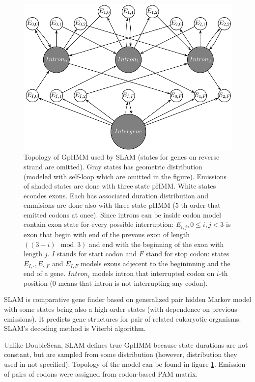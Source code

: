 \begin{figure}
\begin{center}
\includegraphics{../figures/slam.pdf}
\end{center}
\caption[HMM topology of SLAM's GpHMM]{
Topology of GpHMM used by SLAM (states for genes on reverse strand are omitted).
Gray states has geometric distribution (modeled with self-loop which are omitted
in the figure). Emissions of shaded states are done with three state pHMM. White
states econdes exons. Each has associated duration distribution and emmisions
are done also with three-state pHMM ($5$-th order that emitted codons at once).
Since introns can be inside codon model contain exon state for every possible
interruption: $E_{i,j},0\leq i,j<3$ is exon that begin with end of the prevous
exon of length $((3-i)\mod 3)$ and end with the beginning of the exon with
length $j$. $I$ stands for start codon and $F$ stand for stop codon: states
$E_{I,\cdot},E_{\cdot,F}$ and $E_{I,F}$ models exons adjecent to the begininning
and the end of a gene.  $Intron_i$ models intron that interrupted codon on
$i$-th position ($0$ means that intron is not interrupting any codon).
}\label{FIGURE:SLAM} \end{figure}

SLAM \cite{SLAM2003}  is comparative gene finder based on generalized pair
hidden Markov model \cite{Alexanderson2004} with some states being also a
high-order states (with dependence on previous emissions).  It predicts gene
structures for pair of related eukaryotic organisms. SLAM's decoding method is
Viterbi algorithm. 

Unlike DoubleScan, SLAM defines true GpHMM because state durations are not
constant, but are sampled from some distribution (however, distribution they
used in not specified). Topology of the model can be found in figure
\ref{FIGURE:SLAM}.
Emission of pairs of codons were assigned from codon-based PAM matrix.


